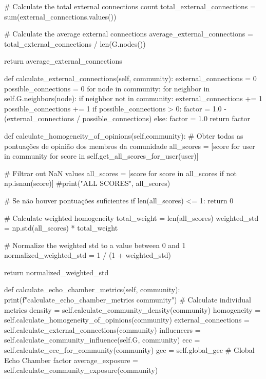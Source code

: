 \begin{codigo}[caption={Exemplo de classe Python para deteção de câmaras de eco}, label={codigo:echochamberdetector}, language=Python, breaklines=true]
        # Calculate the total external connections count
        total_external_connections = sum(external_connections.values())

        # Calculate the average external connections
        average_external_connections = total_external_connections / len(G.nodes())

        return average_external_connections

    def calculate_external_connections(self, community):
        external_connections = 0
        possible_connections = 0
        for node in community:
            for neighbor in self.G.neighbors(node):
                if neighbor not in community:
                    external_connections += 1
                possible_connections += 1
        if possible_connections > 0:
            factor = 1.0 - (external_connections / possible_connections)
        else:
            factor = 1.0
        return factor

    def calculate_homogeneity_of_opinions(self,community):
        # Obter todas as pontuações de opinião dos membros da comunidade
        all_scores = [score for user in community for score in self.get_all_scores_for_user(user)]

        # Filtrar out NaN values
        all_scores = [score for score in all_scores if not np.isnan(score)]
        #print("ALL SCORES", all_scores)

        # Se não houver pontuações suficientes
        if len(all_scores) <= 1:
            return 0

        # Calculate weighted homogeneity
        total_weight = len(all_scores)
        weighted_std = np.std(all_scores) * total_weight

        # Normalize the weighted std to a value between 0 and 1
        normalized_weighted_std = 1 / (1 + weighted_std)

        return normalized_weighted_std


    def calculate_echo_chamber_metrics(self, community):
        print(f"calculate_echo_chamber_metrics {community}")
        # Calculate individual metrics
        density = self.calculate_community_density(community)
        homogeneity = self.calculate_homogeneity_of_opinions(community)
        external_connections = self.calculate_external_connections(community)
        influencers = self.calculate_community_influence(self.G, community)
        ecc = self.calculate_ecc_for_community(community)
        gec = self.global_gec  # Global Echo Chamber factor
        average_exposure = self.calculate_community_exposure(community)


\end{codigo}
